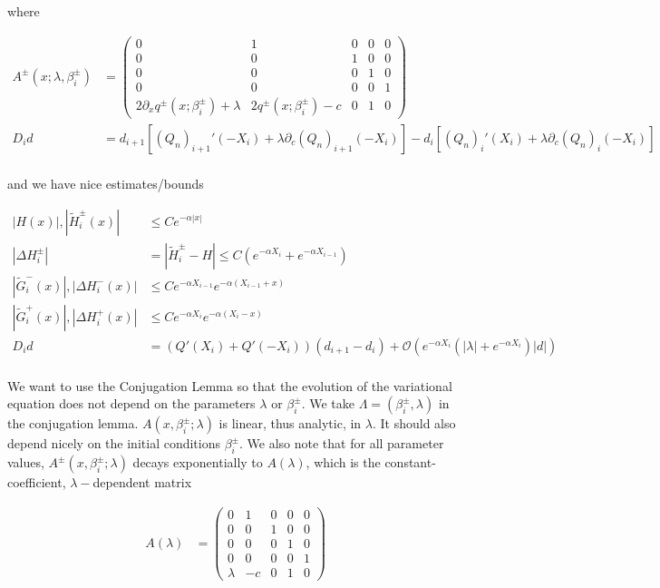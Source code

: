 \documentclass[12pt]{article}
\begin{document}
where

\begin{align*}
A^\pm(x; \lambda, \beta_i^\pm) &= \begin{pmatrix}0 & 1 & 0 & 0 & 0 \\0 & 0 & 1 & 0 & 0 \\0 & 0 & 0 & 1 & 0 \\0 & 0 & 0 & 0 & 1 \\
2 \partial_x q^\pm(x; \beta_i^\pm) + \lambda & 2 q^\pm(x; \beta_i^\pm) - c & 0 & 1 & 0 \end{pmatrix} \\
D_i d &= d_{i+1}[(Q_n)_{i+1}'(-X_i) + \lambda \partial_c (Q_n)_{i+1}(-X_i)]
- d_i [ (Q_n)_i'(X_i) + \lambda \partial_c (Q_n)_i(-X_i) ] \\
\end{align*}

and we have nice estimates/bounds

\begin{align*}
|H(x)|, |\tilde{H}_i^\pm(x)| &\leq C e^{-\alpha |x|} \\
|\Delta H_i^\pm| &= |\tilde{H}_i^\pm - H| \leq C(e^{-\alpha X_i} + e^{-\alpha X_{i-1}} ) \\
|\tilde{G}_i^-(x)|, |\Delta H_i^-(x)| &\leq C e^{-\alpha X_{i-1}} e^{-\alpha(X_{i-1} + x) } \\
|\tilde{G}_i^+(x)|, |\Delta H_i^+(x)| &\leq C e^{-\alpha X_i} e^{-\alpha(X_i - x) } \\
D_i d &= ( Q'(X_i) + Q'(-X_i))(d_{i+1} - d_i ) + \mathcal{O} \left( e^{-\alpha X_i} \left( |\lambda| +  e^{-\alpha X_i}  \right) |d| \right) \\
\end{align*}

We want to use the Conjugation Lemma so that the evolution of the variational equation does not depend on the parameters $\lambda$ or $\beta_i^\pm$. We take $\Lambda = (\beta_i^\pm, \lambda)$ in the conjugation lemma. $A(x, \beta_i^\pm; \lambda)$ is linear, thus analytic, in $\lambda$. It should also depend nicely on the initial conditions $\beta_i^\pm$. We also note that for all parameter values, $A^\pm(x, \beta_i^\pm; \lambda)$ decays exponentially to $A(\lambda)$, which is the constant-coefficient, $\lambda-$dependent matrix 

\begin{align*}
A(\lambda) &=  \begin{pmatrix}0 & 1 & 0 & 0 & 0 \\0 & 0 & 1 & 0 & 0 \\0 & 0 & 0 & 1 & 0 \\0 & 0 & 0 & 0 & 1 \\
\lambda & -c & 0 & 1 & 0 \end{pmatrix}
\end{align*}
\end{document}
